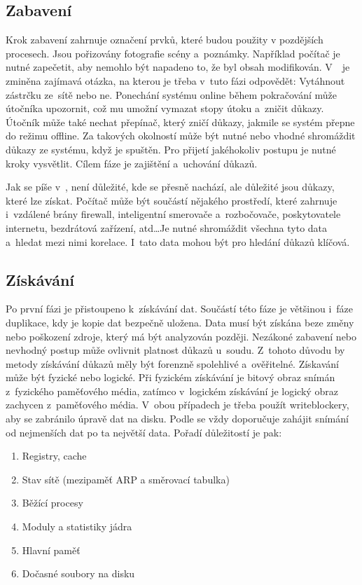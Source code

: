 \documentclass[thesis=B,czech]{FITthesis}[2012/06/26]
\begin{document}
\subsection{Zabavení}
Krok zabavení zahrnuje označení prvků, které budou použity v pozdějších procesech. Jsou pořizovány fotografie scény a~poznámky. Například počítač je nutné zapečetit, aby nemohlo být napadeno to, že byl obsah modifikován. V~\cite{for_sez}~je zminěna zajímavá otázka, na kterou je třeba v~tuto fázi odpovědět: Vytáhnout zástrčku ze~sítě nebo ne. Ponechání systému online během pokračování může útočníka upozornit, což mu umožní vymazat stopy útoku a~zničit důkazy. Útočník může také nechat přepínač, který zničí důkazy, jakmile se systém přepne do režimu offline. Za takových okolností může být nutné nebo vhodné shromáždit důkazy ze systému, když je spuštěn. Pro přijetí jakéhokoliv postupu je nutné kroky vysvětlit. Cílem fáze je zajištění a~uchování důkazů.

Jak se píše v~\cite{palmer2002forensic}, není důležité, kde se přesně nachází, ale důležité jsou důkazy, které lze získat. Počítač může být součástí nějakého prostředí, které zahrnuje i~vzdálené brány firewall, inteligentní smerovače a~rozbočovače, poskytovatele internetu, bezdrátová zařízení, atd\dots Je nutné shromáždit všechna tyto data a~hledat mezi nimi korelace. I~tato data mohou být pro hledání důkazů klíčová.

\subsection{Získávání}
Po první fázi je přistoupeno k~získávání dat. Součástí této fáze je většinou i~fáze duplikace, kdy je kopie dat bezpečně uložena. Data musí být získána beze změny nebo poškození zdroje, který má být analyzován později. Nezákoné zabavení nebo nevhodný postup může ovlivnit platnost důkazů u~soudu. Z~tohoto důvodu by metody získávání důkazů měly být forenzně spolehlivé a~ověřitelné. Získavání může být fyzické nebo logické. Při fyzickém získávání je bitový obraz snímán z~fyzického paměťového média, zatímco v~logickém získávání je logický obraz zachycen z~paměťového média. V~obou případech je třeba použít writeblockery, aby se zabránilo úpravě dat na disku. Podle \cite{for_sez} se vždy doporučuje zahájit snímání od nejmenších dat po ta největší data. Pořadí důležitostí je pak: 

\begin{enumerate}
\item Registry, cache
\item Stav sítě (mezipaměť ARP a směrovací tabulka)
\item Běžící procesy
\item Moduly a statistiky jádra
\item Hlavní paměť
\item Dočasné soubory na disku
\end{enumerate}
\end{document}
